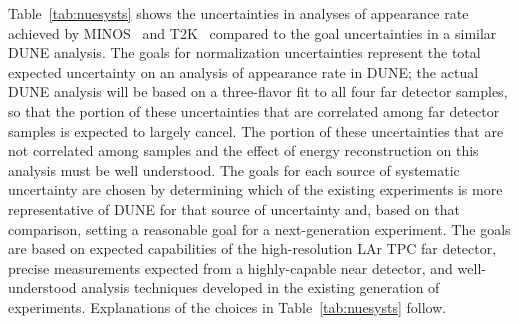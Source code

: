 Table~\ref{tab:nuesysts} shows the uncertainties in
analyses of \nue appearance rate achieved by MINOS~\cite{Adamson:2013ue}
and T2K~\cite{Abe:2015awa} compared to the goal uncertainties in a similar DUNE analysis.
The goals for normalization uncertainties represent the total expected uncertainty on
an analysis of \nue appearance rate in DUNE; the actual DUNE analysis will be based on
a three-flavor fit to all four far detector samples, so that the portion of these
uncertainties that are correlated among far detector samples is expected to largely
cancel. The portion of these uncertainties that are not correlated among samples and
the effect of energy reconstruction on this analysis must be well understood.
The goals for each source of systematic uncertainty are chosen by determining which
of the existing experiments is more representative of DUNE for that source
of uncertainty and, based on that comparison, setting a reasonable goal for a next-generation
experiment. The goals are based on expected capabilities of the high-resolution
LAr TPC far detector, precise measurements expected from a highly-capable near detector,
and well-understood analysis techniques developed in the existing generation of experiments.
Explanations of the choices in Table~\ref{tab:nuesysts} follow.
%
